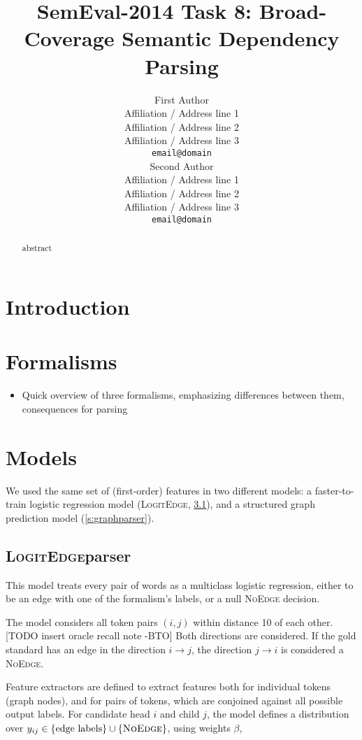 \documentclass[11pt]{article}
\title{SemEval-2014 Task 8: Broad-Coverage Semantic Dependency Parsing}
\author{First Author \\
  Affiliation / Address line 1 \\
  Affiliation / Address line 2 \\
  Affiliation / Address line 3 \\
  {\tt email@domain} \\\And
  Second Author \\
  Affiliation / Address line 1 \\
  Affiliation / Address line 2 \\
  Affiliation / Address line 3 \\
  {\tt email@domain} \\}
\date{}
\newcommand{\bocomment}[1]{\textcolor{Bittersweet}{[#1 -BTO]}}
\begin{document}
\maketitle
\begin{abstract}
  abstract
\end{abstract}



\section{Introduction}



\section{Formalisms}

\begin{itemize}
\item Quick overview of three formalisms, emphasizing differences between them, consequences for parsing
\end{itemize}


\section{Models}
\newcommand{\logitedge}{\textsc{LogitEdge}}

We used the same set of (first-order) features
in two different models: a faster-to-train
logistic regression model (\logitedge, \ref{s:logitedge}),
and a structured graph prediction model (\ref{s:graphparser}).


\subsection{\logitedge parser} \label{s:logitedge}

This model treats every pair of words as a multiclass logistic regression,
either to be an edge with one of the formalism's labels, or a null
\textsc{NoEdge} decision.  


The model considers all token pairs $(i,j)$ within distance 10 of each other. \bocomment{TODO insert oracle recall note}  Both directions are considered.  If the gold standard has an edge in the direction $i \rightarrow j$, the direction $j\rightarrow i$ is considered a \textsc{NoEdge}.

Feature extractors are defined to extract features both for individual tokens (graph nodes), and for pairs of tokens, which are conjoined against all possible output labels.
For candidate head $i$ and child $j$, the model defines a distribution over
$y_{ij} \in \{\text{edge labels}\} \cup \{\textsc{NoEdge}\}$, using weights $\beta$,
\end{document}
